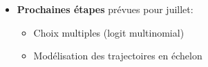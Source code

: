 \documentclass[xcolor=table,ignorenonframetext,12pt]{beamer}
\newenvironment{choixmarges}[2]{\begin{list}{}{%
\setlength{\topsep}{0pt}%
\setlength{\leftmargin}{0pt}%
\setlength{\rightmargin}{0pt}%
\setlength{\listparindent}{\parindent}%
\setlength{\itemindent}{\parindent}%
\setlength{\parsep}{0pt plus 1pt}%
\addtolength{\leftmargin}{#1}%
\addtolength{\rightmargin}{#2}%
}\item }{\end{list}}
\begin{document}
\begin{frame}
\begin{choixmarges}{-0.5cm}{-0.5cm}
\begin{itemize}
\begin{itemize}
\end{itemize}


\vspace{0.1cm}

\item\textbf{Prochaines étapes} prévues pour juillet:
\begin{itemize}
\item Choix multiples (logit multinomial)
\item Modélisation des trajectoires en échelon
\end{itemize}


\end{itemize}



\end{choixmarges}
\end{frame}
\end{document}
